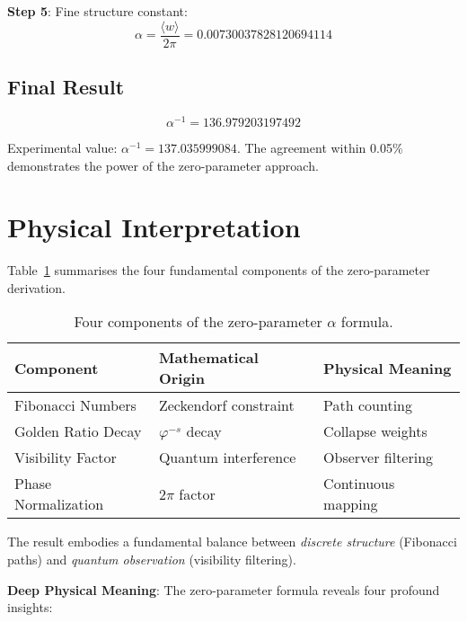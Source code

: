 \documentclass[%
 reprint,
 amsmath,amssymb,
 aps,
 prd,
 10pt,
 nofootinbib,      %
 longbibliography  %
]{revtex4-2}
\theoremstyle{definition}
\theoremstyle{remark}
\begin{document}
\textbf{Step 5}: Fine structure constant:
\begin{equation}
\alpha = \frac{\langle w \rangle}{2\pi} = 0.00730037828120694114
\end{equation}

\subsection{Final Result}

\begin{equation}
\boxed{\alpha^{-1} = 136.979203197492}
\end{equation}

Experimental value: $\alpha^{-1} = 137.035999084$. The agreement within 0.05\% demonstrates the power of the zero-parameter approach.

\section{Physical Interpretation}\label{sec:interpretation}

Table~\ref{tab:contributions}
summarises the four fundamental components of the zero-parameter derivation.
\begin{table}[h!]
  \centering
  \small
  \begin{tabular}{@{}lll@{}}
    \toprule
    Component & Mathematical Origin & Physical Meaning \\
    \midrule
    Fibonacci Numbers & Zeckendorf constraint & Path counting \\
    Golden Ratio Decay & $\varphi^{-s}$ decay & Collapse weights \\
    Visibility Factor & Quantum interference & Observer filtering \\
    Phase Normalization & $2\pi$ factor & Continuous mapping \\
    \bottomrule
  \end{tabular}
  \caption{Four components of the zero-parameter $\alpha$ formula.}
  \label{tab:contributions}
\end{table}

The result embodies a fundamental balance between
\emph{discrete structure} (Fibonacci paths) and
\emph{quantum observation} (visibility filtering).

\textbf{Deep Physical Meaning}: The zero-parameter formula reveals four profound insights:
\end{document}
